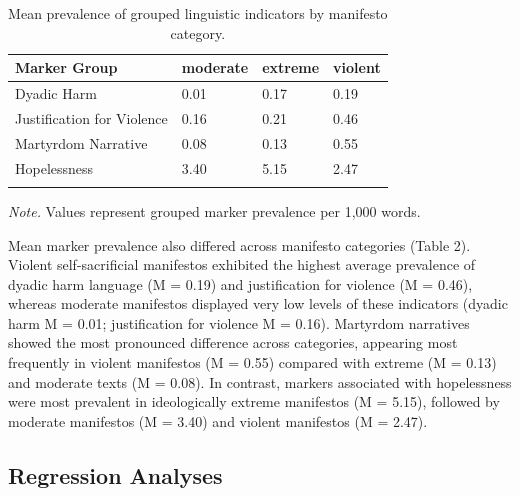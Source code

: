 \documentclass[
  english,
  man,floatsintext]{apa6}
\begin{document}
\begin{table}[tbp]

\begin{center}
\begin{threeparttable}

\caption{\label{tab:manifesto-descriptives}Mean prevalence of grouped linguistic indicators by manifesto category.}

\begin{tabular}{llll}
\toprule
Marker Group & \multicolumn{1}{c}{moderate} & \multicolumn{1}{c}{extreme} & \multicolumn{1}{c}{violent}\\
\midrule
Dyadic Harm & 0.01 & 0.17 & 0.19\\
Justification for Violence & 0.16 & 0.21 & 0.46\\
Martyrdom Narrative & 0.08 & 0.13 & 0.55\\
Hopelessness & 3.40 & 5.15 & 2.47\\
\bottomrule
\addlinespace
\end{tabular}

\begin{tablenotes}[para]
\normalsize{\textit{Note.} Values represent grouped marker prevalence per 1,000 words.}
\end{tablenotes}

\end{threeparttable}
\end{center}

\end{table}

Mean marker prevalence also differed across manifesto categories (Table 2). Violent self-sacrificial manifestos exhibited the highest average prevalence of dyadic harm language (M = 0.19) and justification for violence (M = 0.46), whereas moderate manifestos displayed very low levels of these indicators (dyadic harm M = 0.01; justification for violence M = 0.16). Martyrdom narratives showed the most pronounced difference across categories, appearing most frequently in violent manifestos (M = 0.55) compared with extreme (M = 0.13) and moderate texts (M = 0.08). In contrast, markers associated with hopelessness were most prevalent in ideologically extreme manifestos (M = 5.15), followed by moderate manifestos (M = 3.40) and violent manifestos (M = 2.47).

\subsection{Regression Analyses}\label{regression-analyses}
\end{document}
